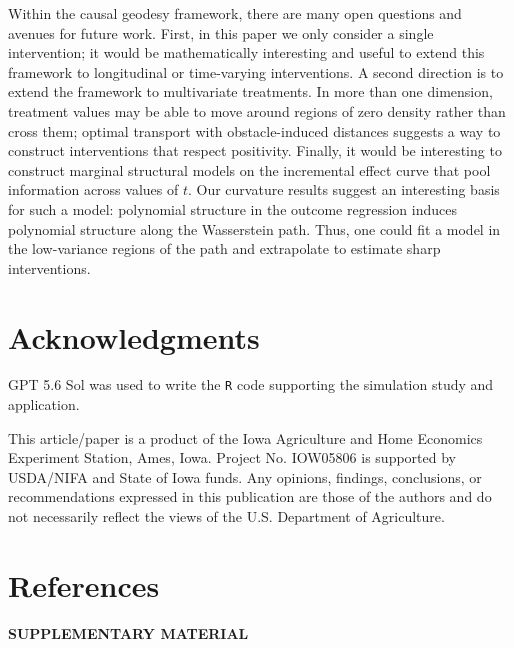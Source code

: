 \documentclass[11pt,twoside]{article}
\theoremstyle{definition}
\theoremstyle{remark}
\begin{document}
Within the causal geodesy framework, there are many open questions and avenues for future work. First, in this paper we only consider a single intervention; it would be mathematically interesting and useful to extend this framework to longitudinal or time-varying interventions. A second direction is to extend the framework to multivariate treatments. In more than one dimension, treatment values may be able to move around regions of zero density rather than cross them; optimal transport with obstacle-induced distances \citep{cavalletti2012} suggests a way to construct interventions that respect positivity. Finally, it would be interesting to construct marginal structural models \citep{robins2000} on the incremental effect curve that pool information across values of $t$. Our curvature results suggest an interesting basis for such a model: polynomial structure in the outcome regression induces polynomial structure along the Wasserstein path. Thus, one could fit a model in the low-variance regions of the path and extrapolate to estimate sharp interventions.

\section*{Acknowledgments}

GPT 5.6 Sol was used to write the \texttt{R} code supporting the simulation study and application. \medskip

\noindent This article/paper is a product of the Iowa Agriculture and Home Economics Experiment Station, Ames, Iowa. Project No. IOW05806 is supported by USDA/NIFA and State of Iowa funds. Any opinions, findings, conclusions, or recommendations expressed in this publication are those of the authors and do not necessarily reflect the views of the U.S. Department of Agriculture.

\section*{References}
\vspace{-1cm}



\setlength{\parindent}{0cm}
\appendix

\begin{center}
{\large\bf SUPPLEMENTARY MATERIAL}
\end{center}
\end{document}

